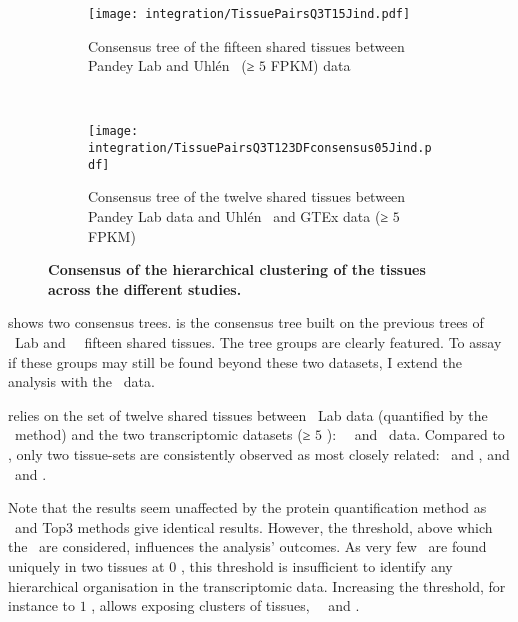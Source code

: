 \begin{figure}[!htp]
    \begin{subfigure}[t]{0.53\textwidth}
        \captionsetup{margin=0.6cm}
        \centering \texttt{[image: integration/TissuePairsQ3T15Jind.pdf]}
        \caption{Consensus tree of the fifteen shared tissues between Pandey Lab
        and Uhlén \etal\ (≥ $5$ FPKM) data}\label{fig:consensus2D15TQ3}
    \end{subfigure}~%
    \begin{subfigure}[t]{0.53\textwidth}
        \captionsetup{margin=0.6cm}
        \centering \texttt{[image: integration/TissuePairsQ3T123DFconsensus05Jind.pdf]}
        \caption{Consensus tree of the twelve shared tissues
        between Pandey Lab data and
        Uhlén \etal\ and GTEx data (≥ $5$ FPKM)}\label{fig:consensusTree05}
    \end{subfigure}
    \vspace{-3mm}
    \caption[Tissues hierachical clustering for Pandey Lab and Uhlén \etal\ data]{\label{fig:consensusTrees}%
    \textbf{Consensus of the hierarchical clustering of the tissues across the different studies.}
    }
\end{figure}

 shows two consensus trees.
 is the consensus tree built on
the previous trees of \pandey\ Lab and \uhlen\ \etal\ fifteen shared tissues.
The tree groups are clearly featured.
To assay if these groups may still be found beyond these two datasets,
I extend the analysis with the \gtex\ data.\mybr\

 relies on the set of twelve shared tissues between
\pandey\ Lab data (quantified by the \PPKM\ method)
and the two transcriptomic datasets (≥ $5$ \FPKM): \uhlen\ \etal\ and \gtex\ data.
Compared to ,
only two tissue-sets are consistently observed
as most closely related: \Liver\ and \Kidney, and \Testis\ and \Ovary.\mybr\

Note that the results seem unaffected by the protein quantification method
as \PPKM\ and Top3 methods give identical results.
However, the threshold,
above which the \mRNAs\ are considered,
influences the analysis' outcomes.
As very few \mRNAs\ are found uniquely in two tissues at $0$ \FPKM,
this threshold is insufficient
to identify any hierarchical organisation in the transcriptomic data.
Increasing the threshold,
for instance to $1$ \FPKM,
allows exposing clusters of tissues, \eg\ \Liver\ and \Kidney{}.

